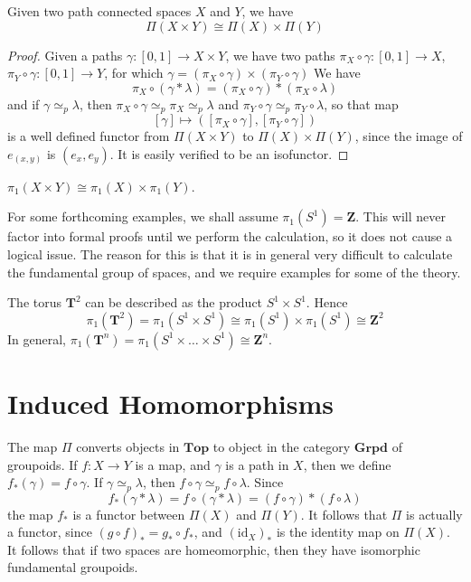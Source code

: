 \begin{theorem}
    Given two path connected spaces $X$ and $Y$, we have
    \[ \Pi(X \times Y) \cong \Pi(X) \times \Pi(Y) \]
\end{theorem}
\begin{proof}
    Given a paths $\gamma: [0,1] \to X \times Y$, we have two paths $\pi_X \circ \gamma: [0,1] \to X$, $\pi_Y \circ \gamma: [0,1] \to Y$, for which $\gamma = (\pi_X \circ \gamma) \times (\pi_Y \circ \gamma)$ We have
    \[ \pi_X \circ (\gamma * \lambda) = (\pi_X \circ \gamma) * (\pi_X \circ \lambda) \]
    and if $\gamma \simeq_p \lambda$, then $\pi_X \circ \gamma \simeq_p \pi_X \simeq_p \lambda$ and $\pi_Y \circ \gamma \simeq_p \pi_Y \circ \lambda$, so that map
    \[ [\gamma] \mapsto ([\pi_X \circ \gamma], [\pi_Y \circ \gamma]) \]
    is a well defined functor from $\Pi(X \times Y)$ to $\Pi(X) \times \Pi(Y)$, since the image of $e_{(x,y)}$ is $(e_x, e_y)$. It is easily verified to be an isofunctor.
\end{proof}

\begin{corollary}
    $\pi_1(X \times Y) \cong \pi_1(X) \times \pi_1(Y)$.
\end{corollary}

For some forthcoming examples, we shall assume $\pi_1(S^1) = \mathbf{Z}$. This will never factor into formal proofs until we perform the calculation, so it does not cause a logical issue. The reason for this is that it is in general very difficult to calculate the fundamental group of spaces, and we require examples for some of the theory.

\begin{example}
    The torus $\mathbf{T}^2$ can be described as the product $S^1 \times S^1$. Hence
    \[ \pi_1(\mathbf{T}^2) = \pi_1(S^1 \times S^1) \cong \pi_1(S^1) \times \pi_1(S^1) \cong \mathbf{Z}^2 \]
    In general, $\pi_1(\mathbf{T}^n) = \pi_1(S^1 \times \dots \times S^1) \cong \mathbf{Z}^n$.
\end{example}





\section{Induced Homomorphisms}

The map $\Pi$ converts objects in $\textbf{Top}$  to object in the category $\textbf{Grpd}$ of groupoids. If $f: X \to Y$ is a map, and $\gamma$ is a path in $X$, then we define $f_*(\gamma) = f \circ \gamma$. If $\gamma \simeq_p \lambda$, then $f \circ \gamma \simeq_p f \circ \lambda$. Since
%
\[ f_*(\gamma * \lambda) = f \circ (\gamma * \lambda) = (f \circ \gamma) * (f \circ \lambda) \]
%
the map $f_*$ is a functor between $\Pi(X)$ and $\Pi(Y)$. It follows that $\Pi$ is actually a functor, since $(g \circ f)_* = g_* \circ f_*$, and ${(\text{id}_X)}_*$ is the identity map on $\Pi(X)$. It follows that if two spaces are homeomorphic, then they have isomorphic fundamental groupoids.

